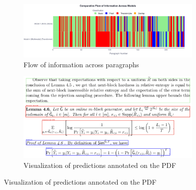 \documentclass[runningheads]{llncs}
\begin{document}
\begin{figure}[h]
	\centering
	\begin{subfigure}[b]{0.48\textwidth}
		\centering
		\includegraphics[width=\textwidth]{images/comparitive-v3.png}
		\caption{Flow of information across paragraphs}
		\label{fig:model_comp}
	\end{subfigure}
	\hfill
	\begin{subfigure}[b]{0.48\textwidth}
		\centering
		\includegraphics[width=\textwidth]{images/vis_on_pdf.png}
		\caption{Visualization of predictions annotated on the PDF}
		\label{fig:vis_on_pdf}
	\end{subfigure}
	
	\vspace{0.5cm}
	

\end{figure}
\end{document}
